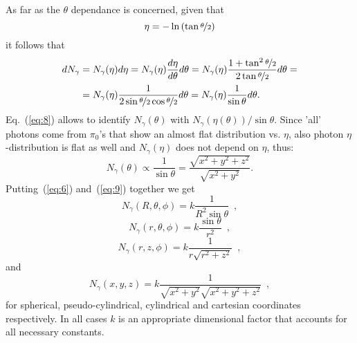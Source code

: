 As far as the $\theta$ dependance is concerned, given that 
\begin{equation}
\eta = -\ln \left( \tan \nicefrac{\theta}{2} \right)
\label{eq:7}
\end{equation}
it follows that
\begin{equation}
\begin{split}
dN_\gamma & = N_\gamma(\eta) d\eta  =
N_\gamma(\eta)\frac{d\eta}{d\theta} d\theta  = N_\gamma(\eta)\frac{1+\tan^2\nicefrac[]{\theta}{2}
 }{2\tan\nicefrac{\theta}{2}}  d\theta =\\ 
 & =
 N_\gamma(\eta)\frac{1}{2\sin\nicefrac[]{\theta}{2}\cos\nicefrac[]{\theta}{2}}  d\theta  
 = N_\gamma(\eta)\frac{1}{\sin\theta}  d\theta .
\label{eq:8}
\end{split}
\end{equation}
Eq.~(\ref{eq:8}) allows to identify $N_\gamma(\theta)$ with $N_\gamma(\eta(\theta))/\sin{\theta}$.
Since 'all' photons come from $\pi_0$'s that show an almost flat
distribution vs. $\eta$, also photon $\eta$-distribution is flat as
well and $N_\gamma(\eta)$ does not depend on $\eta$, thus:
\begin{equation}
N_\gamma(\theta) \propto \frac{1}{\sin \theta} = \frac{\sqrt{x^2+y^2+z^2}}{\sqrt{x^2+y^2}}.
\label{eq:9}
\end{equation}
Putting~(\ref{eq:6}) and~(\ref{eq:9}) together we get 
\begin{equation}
N_{\gamma} (R, \theta, \phi) = k \frac{1}{R^2\sin \theta} \, \, \, ,
\label{eq:10pre}
\end{equation}
\begin{equation}
N_{\gamma} (r, \theta, \phi) = k \frac{\sin \theta}{r^2} \,\,\, ,
\label{eq:10}
\end{equation}
\begin{equation}
N_{\gamma} (r, z, \phi) = k \frac{1}{r\sqrt{r^2+z^2}} \,\,\, ,
\label{eq:10bis}
\end{equation}
and
\begin{equation}
N_{\gamma} (x, y, z) = k \frac{1}{\sqrt{x^2+y^2}\sqrt{x^2+y^2+z^2}} \,\,\, ,
\label{eq:10tris}
\end{equation}
for spherical, pseudo-cylindrical, cylindrical and cartesian coordinates
respectively. In all cases $k$ is an appropriate dimensional factor
that accounts for all necessary constants.

